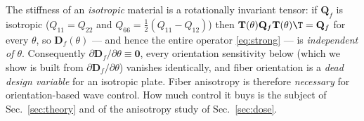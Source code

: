\begin{remark}
\label{rem:iso}
The stiffness of an \emph{isotropic} material is a rotationally invariant tensor:
if $\mathbf Q_f$ is isotropic ($Q_{11}=Q_{22}$ and $Q_{66}=\tfrac12(Q_{11}-Q_{12})$)
then $\mathbf T(\theta)\mathbf Q_f\mathbf T(\theta)\T=\mathbf Q_f$ for every
$\theta$, so $\mathbf D_f(\theta)$ --- and hence the entire operator
\eqref{eq:strong} --- is \emph{independent of $\theta$}. Consequently
$\partial\mathbf D_f/\partial\theta\equiv\mathbf 0$, every orientation
sensitivity below (which we show is built from $\partial\mathbf D_f/\partial
\theta$) vanishes identically, and fiber orientation is a \emph{dead design
variable} for an isotropic plate. Fiber anisotropy is therefore \emph{necessary} for orientation-based wave control.
How much control it buys is the subject of Sec.~\ref{sec:theory} and of the
anisotropy study of Sec.~\ref{sec:dose}.
\end{remark}

